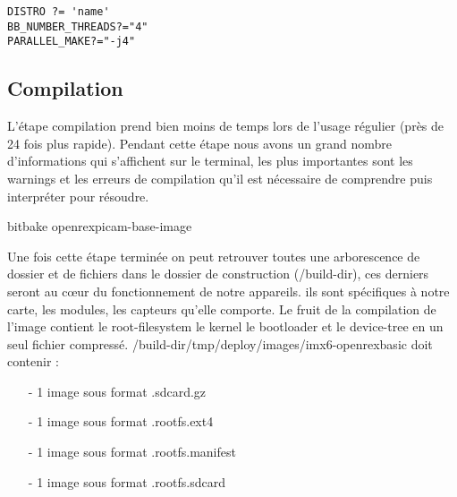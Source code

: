 \begin{lstlisting}
DISTRO ?= 'name'
BB_NUMBER_THREADS?="4"
PARALLEL_MAKE?="-j4"
\end{lstlisting}
\subsection{Compilation}

L’étape compilation prend bien moins de temps lors de l’usage régulier (près
de 24 fois plus rapide). Pendant cette étape nous avons un grand nombre
d’informations qui s’affichent sur le terminal, les plus importantes sont les
warnings et les erreurs de compilation qu’il est nécessaire de comprendre puis
interpréter pour résoudre.

\begin{tcolorbox}
	bitbake openrexpicam-base-image
\end{tcolorbox}

Une fois cette étape terminée on peut retrouver toutes une arborescence de dossier et de fichiers dans le dossier de construction (/build-dir), ces derniers seront au cœur du fonctionnement de notre appareils. ils sont spécifiques à notre carte, les modules, les capteurs qu’elle comporte. Le fruit de la compilation de l’image contient le root-filesystem le kernel le bootloader et le device-tree en un seul fichier compressé. /build-dir/tmp/deploy/images/imx6-openrexbasic doit contenir :

\begin{itemize}
	\item[-]1 image sous format .sdcard.gz
	\item[-]1 image sous format .rootfs.ext4
	\item[-]1 image sous format .rootfs.manifest
	\item[-]1 image sous format .rootfs.sdcard
\end{itemize}
